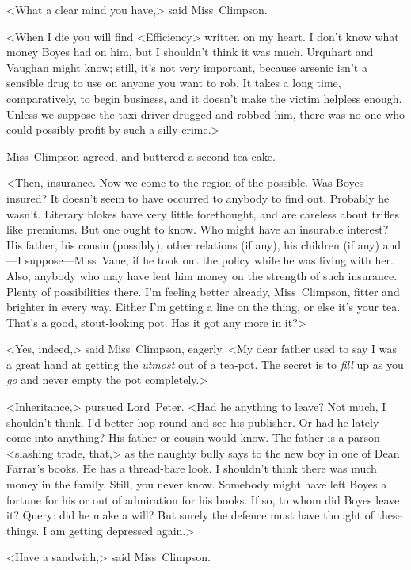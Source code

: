 <What a clear mind you have,> said Miss~Climpson.

<When I die you will find <Efficiency> written on my heart. I don't know what money Boyes had on him, but I shouldn't think it was much. Urquhart and Vaughan might know; still, it's not very important, because arsenic isn't a sensible drug to use on anyone you want to rob. It takes a long time, comparatively, to begin business, and it doesn't make the victim helpless enough. Unless we suppose the taxi-driver drugged and robbed him, there was no one who could possibly profit by such a silly crime.>

Miss~Climpson agreed, and buttered a second tea-cake.

<Then, insurance. Now we come to the region of the possible. Was Boyes insured? It doesn't seem to have occurred to anybody to find out. Probably he wasn't. Literary blokes have very little forethought, and are careless about trifles like premiums. But one ought to know. Who might have an insurable interest? His father, his cousin (possibly), other relations (if any), his children (if any) and—I suppose—Miss~Vane, if he took out the policy while he was living with her. Also, anybody who may have lent him money on the strength of such insurance. Plenty of possibilities there. I'm feeling better already, Miss~Climpson, fitter and brighter in every way. Either I'm getting a line on the thing, or else it's your tea. That's a good, stout-looking pot. Has it got any more in it?>

<Yes, indeed,> said Miss~Climpson, eagerly. <My dear father used to say I was a great hand at getting the \emph{utmost} out of a tea-pot. The secret is to \emph{fill} up as you \emph{go} and never empty the pot completely.>

<Inheritance,> pursued Lord~Peter. <Had he anything to leave? Not much, I shouldn't think. I'd better hop round and see his publisher. Or had he lately come into anything? His father or cousin would know. The father is a parson—<slashing trade, that,> as the naughty bully says to the new boy in one of Dean Farrar's books. He has a thread-bare look. I shouldn't think there was much money in the family. Still, you never know. Somebody might have left Boyes a fortune for his  or out of admiration for his books. If so, to whom did Boyes leave it? Query: did he make a will? But surely the defence must have thought of these things. I am getting depressed again.>

<Have a sandwich,> said Miss~Climpson.


